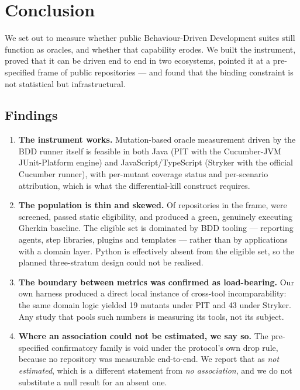 \section{Conclusion}
\label{sec:conclusion}

We set out to measure whether public Behaviour-Driven Development suites still function as oracles,
and whether that capability erodes. We built the instrument, proved that it can be driven end to end
in two ecosystems, pointed it at a pre-specified frame of public repositories --- and found that the
binding constraint is not statistical but infrastructural.

\subsection{Findings}

\begin{enumerate}
\item \textbf{The instrument works.} Mutation-based oracle measurement driven by the BDD runner itself
      is feasible in both Java (PIT with the Cucumber-JVM JUnit-Platform engine) and
      JavaScript/TypeScript (Stryker with the official Cucumber runner), with per-mutant coverage
      status and per-scenario attribution, which is what the differential-kill construct requires.
\item \textbf{The population is thin and skewed.} Of \Nframe{} repositories in the frame,
      \Nscreened{} were screened, \Neligible{} passed static eligibility, and \Ngreen{} produced a
      green, genuinely executing Gherkin baseline. The eligible set is dominated by BDD tooling ---
      reporting agents, step libraries, plugins and templates --- rather than by applications with a
      domain layer. Python is effectively absent from the eligible set, so the planned three-stratum
      design could not be realised.
\item \textbf{The boundary between metrics was confirmed as load-bearing.} Our own harness produced a
      direct local instance of cross-tool incomparability: the same domain logic yielded 19 mutants
      under PIT and 43 under Stryker. Any study that pools such numbers is measuring its tools, not
      its subject.
\item \textbf{Where an association could not be estimated, we say so.} The pre-specified confirmatory
      family is void under the protocol's own drop rule, because no repository was measurable
      end-to-end. We report that as \emph{not estimated}, which is a different statement from
      \emph{no association}, and we do not substitute a null result for an absent one.
\end{enumerate}

